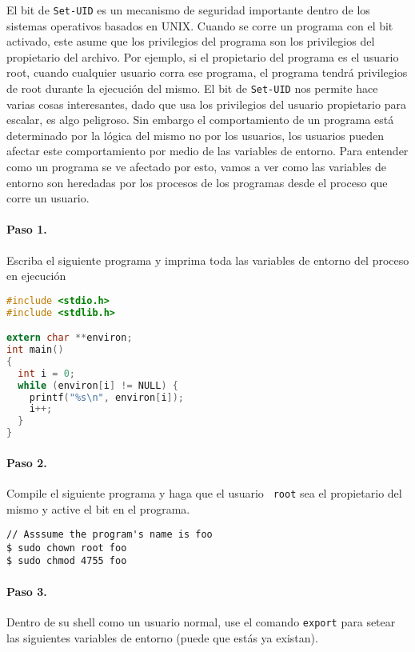 El bit de {\tt Set-UID} es un mecanismo de seguridad importante dentro de los sistemas operativos basados en UNIX.
Cuando se corre un programa con el bit \setuid activado, este asume que los privilegios del programa son los privilegios del propietario del archivo. Por ejemplo, si el propietario del programa es el usuario root, cuando cualquier usuario corra ese programa, el programa tendrá privilegios de root durante la ejecución del mismo.
El bit de {\tt Set-UID} nos permite hace varias cosas interesantes, dado que usa los privilegios del usuario propietario para escalar, es algo peligroso. Sin embargo el comportamiento de un programa \setuid está determinado por la lógica del mismo no por los usuarios, los usuarios pueden afectar este comportamiento por medio de las variables de entorno.
Para entender como un programa \setuid se ve afectado por esto, vamos a ver como las variables de entorno son heredadas por los procesos de los programas \setuid desde el proceso que corre un usuario.


\paragraph{Paso 1.} Escriba el siguiente programa y imprima toda las variables de entorno del proceso en ejecución

\begin{lstlisting}[language=C]
#include <stdio.h>
#include <stdlib.h>

extern char **environ;
int main()
{
  int i = 0;
  while (environ[i] != NULL) {
    printf("%s\n", environ[i]);
    i++;
  }
}
\end{lstlisting}


\paragraph{Paso 2.} Compile el siguiente programa y haga que el usuario {\tt
root} sea el propietario del mismo y active el bit \setuid en el programa. 

\begin{lstlisting}
// Asssume the program's name is foo
$ sudo chown root foo
$ sudo chmod 4755 foo
\end{lstlisting}



\paragraph{Paso 3.} Dentro de su shell como un usuario normal, use el comando {\tt export} para setear las siguientes variables de entorno (puede que estás ya existan).

